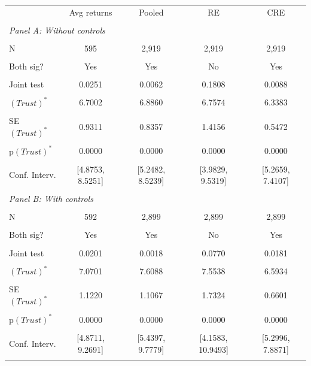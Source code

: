 \def\sym#1{\ifmmode^{#1}\else\(^{#1}\)\fi}
\begin{tabular*}{\linewidth}{@{\hskip\tabcolsep\extracolsep\fill}l*{4}{c}}\toprule
 & Avg returns & Pooled & RE & CRE \\\\ \midrule
\multicolumn{5}{l}{\textit{Panel A: Without controls}} \\\\
N & 595 & 2,919 & 2,919 & 2,919 \\\\
Both sig? & Yes & Yes & No & Yes \\\\
Joint test & 0.0251 & 0.0062 & 0.1808 & 0.0088 \\\\
\((\textit{Trust})^*\) & 6.7002 & 6.8860 & 6.7574 & 6.3383 \\\\
SE\((\textit{Trust})^*\) & 0.9311 & 0.8357 & 1.4156 & 0.5472 \\\\
p\((\textit{Trust})^*\) & 0.0000 & 0.0000 & 0.0000 & 0.0000 \\\\
Conf. Interv. & [4.8753, 8.5251] & [5.2482, 8.5239] & [3.9829, 9.5319] & [5.2659, 7.4107] \\\\
\midrule
\multicolumn{5}{l}{\textit{Panel B: With controls}} \\\\
N & 592 & 2,899 & 2,899 & 2,899 \\\\
Both sig? & Yes & Yes & No & Yes \\\\
Joint test & 0.0201 & 0.0018 & 0.0770 & 0.0181 \\\\
\((\textit{Trust})^*\) & 7.0701 & 7.6088 & 7.5538 & 6.5934 \\\\
SE\((\textit{Trust})^*\) & 1.1220 & 1.1067 & 1.7324 & 0.6601 \\\\
p\((\textit{Trust})^*\) & 0.0000 & 0.0000 & 0.0000 & 0.0000 \\\\
Conf. Interv. & [4.8711, 9.2691] & [5.4397, 9.7779] & [4.1583, 10.9493] & [5.2996, 7.8871] \\\\
\bottomrule
\end{tabular*}
